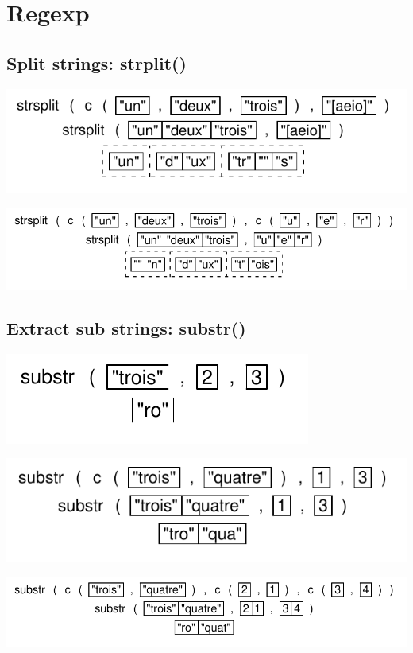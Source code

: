 \documentclass[pdflatex]{article}
\begin{document}

\section{Regexp}

\subsection{Split strings: strplit()}

\includegraphics{strsplit.pdf}

\includegraphics{strsplit_2.pdf}

\subsection{Extract sub strings: substr()}

\includegraphics{substr.pdf}

\includegraphics{substr_2.pdf}

\includegraphics{substr_3.pdf}
\end{document}
